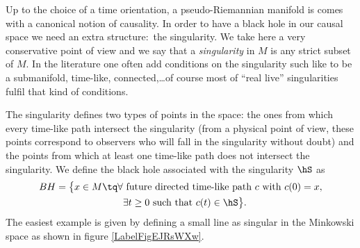 Up to the choice of a time orientation, a pseudo-Riemannian manifold is comes with a canonical notion of causality. In order to have a black hole in our causal space we need an extra structure:~the singularity. We take here a very conservative point of view and we say that a \emph{singularity} in $M$ is any strict subset of $M$. In the literature one often add conditions on the singularity such like to be a submanifold, time-like, connected,\ldots of course most of ``real live'' singularities fulfil that kind of conditions.

The singularity defines two types of points in the space: the ones from which every time-like path intersect the singularity (from a physical point of view, these points correspond to observers who will fall in the singularity without doubt) and the points from which at least one time-like path does not intersect the singularity. We define the black hole associated with the singularity $\hS$ as
\begin{align} 
  BH=\big\{ x\in M\tq \forall &\text{ future directed time-like path } c \text{ with } c(0)=x,\\
			&\exists t\geq0  \text{ such that } c(t)\in \hS \big\}.
\end{align}
The easiest example is given by defining a small line as singular in the Minkowski space as shown in figure \ref{LabelFigEJRsWXw}. 
\newcommand{\CaptionFigEJRsWXw}{The red line is the singularity and the green zone is the black hole associated with.}






